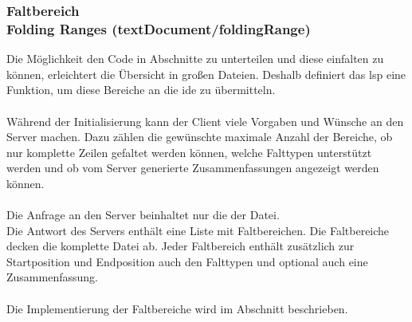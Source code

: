 \documentclass[./einleitung.tex]{subfiles}
\begin{document}
    \subsubsection[Faltbereich]{Faltbereich\\ {\textnormal{\footnotesize Folding Ranges (textDocument/foldingRange) \cite{folding}}}}\label{subsubsec:folding}
    Die Möglichkeit den Code in Abschnitte zu unterteilen und diese einfalten zu können, erleichtert die Übersicht in großen Dateien.
    Deshalb definiert das \acrshort{lsp} eine Funktion, um diese Bereiche an die \acrshort{ide} zu übermitteln.
    \\\\
    Während der Initialisierung kann der Client viele Vorgaben und Wünsche an den Server machen.
    Dazu zählen die gewünschte maximale Anzahl der Bereiche,
    ob nur komplette Zeilen gefaltet werden können,
    welche Falttypen unterstützt werden und ob vom Server generierte Zusammenfassungen angezeigt werden können.
    \\\\
    Die Anfrage an den Server beinhaltet nur die  der Datei.\\
    Die Antwort des Servers enthält eine Liste mit Faltbereichen.
    Die Faltbereiche decken die komplette Datei ab.
    Jeder Faltbereich enthält zusätzlich zur Startposition und Endposition auch den Falttypen und optional auch eine Zusammenfassung.
    \\\\
    Die Implementierung der Faltbereiche wird im Abschnitt  beschrieben.
\end{document}
